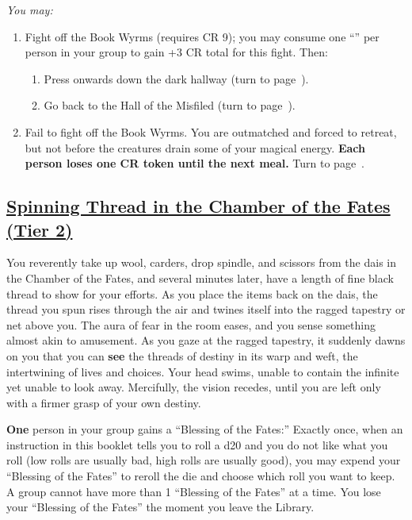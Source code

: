 \documentclass[sheet]{GL2020}
\begin{document}
\vspace{0.5cm}

\begingroup
\itshape
You may:
\begin{enumerate}[A]
  \item Fight off the Book Wyrms (requires CR 9); you may consume one ``\iFlameOrchid{}'' per person in your group to gain +3 CR total for this fight. Then:
	\begin{enumerate}
		\item Press onwards down the dark hallway (turn to page~\pageref{LonesomeVolume}).
		\item Go back to the Hall of the Misfiled (turn to page~\pageref{HallMisfiled}).
	\end{enumerate}
	\item Fail to fight off the Book Wyrms. You are outmatched and forced to retreat, but not before the creatures drain some of your magical energy. \textbf{Each person loses one CR token until the next meal.} Turn to page~\pageref{HallMisfiled}.
\end{enumerate}
\endgroup

\clearpage


\begin{center}\section*{\underline{Spinning Thread in the Chamber of the Fates (Tier 2)}}\end{center}
\label{SpinningThreadChamberofFates}

You reverently take up wool, carders, drop spindle, and scissors from the dais in the Chamber of the Fates, and several minutes later, have a length of fine black thread to show for your efforts. As you place the items back on the dais, the thread you spun rises through the air and twines itself into the ragged tapestry or net above you. The aura of fear in the room eases, and you sense something almost akin to amusement. As you gaze at the ragged tapestry, it suddenly dawns on you that you can \textbf{see} the threads of destiny in its warp and weft, the intertwining of lives and choices. Your head swims, unable to contain the infinite yet unable to look away. Mercifully, the vision recedes, until you are left only with a firmer grasp of your own destiny.

\textbf{One} person in your group gains a ``Blessing of the Fates:'' Exactly once, when an instruction in this booklet tells you to roll a d20 and you do not like what you roll (low rolls are usually bad, high rolls are usually good), you may expend your ``Blessing of the Fates'' to reroll the die and choose which roll you want to keep. A group cannot have more than 1 ``Blessing of the Fates'' at a time. You lose your ``Blessing of the Fates'' the moment you leave the Library.
\end{document}
